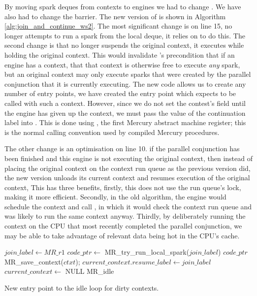 By moving spark deques from contexts to engines we had to change \idle.
We have also had to change the \joinandcontinue barrier.
The new version of \joinandcontinue is shown in Algorithm
\ref{alg:join_and_continue_ws2}.
The most significant change is on line 15,
\joinandcontinue no longer attempts to run a spark from the local deque,
it relies on \idle to do this.
The second change is that \joinandcontinue no longer suspends the original
context, it executes \idle while holding the original context.
This would invalidate \idle's precondition that if an engine has a context,
that that context is otherwise free to execute \emph{any} spark,
but an original context may only execute sparks that were created by the
parallel conjunction that it is currently executing.
The new \idle code allows us to create any number of entry points,
we have created the \idleorigcontext entry point which expects to be called
with such a context.
However, since we do not set the contest's  field until
the engine has given up the context,
we must pass the value of the continuation label into \idleorigcontext.
This is done using , the first Mercury abstract machine
register;
this is the normal calling convention used by compiled Mercury procedures.

The other change is an optimisation on line 10.
if the parallel conjunction has been finished and this engine is not
executing the original context,
then instead of placing the original context on the context run queue as the
previous version did,
the new version unloads its current context and resumes execution of the
original context,
This has three benefits,
firstly, this does not use the run queue's lock,
making it more efficient.
Secondly, in the old algorithm, the engine would schedule the context and
call \idle,
in which it would check the context run queue and was likely to run the same
context anyway.
Thirdly, by deliberately running the context on the CPU that most
recently completed the parallel conjunction,
we may be able to take advantage of relevant data being hot in the CPU's
cache.

\begin{algorithm}[tbp]
\begin{algorithmic}
        \State $join\_label \gets MR\_r1$
        \State $code\_ptr \gets$ MR\_try\_run\_local\_spark($join\_label$)
            \Goto $code\_ptr$
        \EndIf
        \State MR\_save\_context($ctxt$);
        \State $current\_context.resume\_label \gets join\_label$
        \State $current\_context \gets$ NULL
        \Goto MR\_idle
    \EndProcedure
\end{algorithmic}
\caption{New entry point to the idle loop for dirty contexts.}
\label{alg:idle_orig_context}
\end{algorithm}

